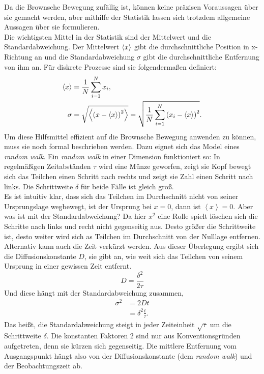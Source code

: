 Da die Brownsche Bewegung zufällig ist, können keine präzisen Voraussagen über sie gemacht werden, aber mithilfe der Statistik lassen sich trotzdem allgemeine Aussagen über sie formulieren.\\
Die wichtigsten Mittel in der Statistik sind der Mittelwert und die Standardabweichung. Der Mittelwert $\left< x \right>$ gibt die durchschnittliche Position in x-Richtung an und die Standardabweichung $\sigma$ gibt die durchschnittliche Entfernung von ihm an. Für diskrete Prozesse sind sie folgendermaßen definiert:
\begin{align}
  \left< x \right> & = \frac{1}{N} \sum_{i=1}^{N} x_i, \\
  \sigma & = \sqrt{\left<  {\left( x - \left< x \right> \right)}^2  \right>} = \sqrt{\frac{1}{N} \sum_{i=1}^{N} {\left( x_i - \left< x \right> \right)}^2}.
\end{align}
Um diese Hilfsmittel effizient auf die Brownsche Bewegung anwenden zu können, muss sie noch formal beschrieben werden. Dazu eignet sich das Model eines \emph{random walk}. Ein \emph{random walk} in einer Dimension funktioniert so: In regelmäßigen Zeitabständen $\tau$ wird eine Münze geworfen, zeigt sie Kopf bewegt sich das Teilchen einen Schritt nach rechts und zeigt sie Zahl einen Schritt nach links. Die Schrittweite $\delta$ für beide Fälle ist gleich groß.\\
Es ist intuitiv klar, dass sich das Teilchen im Durchschnitt nicht von seiner Ursprungslage wegbewegt, ist der Ursprung bei $x = 0$, dann ist $\left< x \right> = 0$. Aber was ist mit der Standardabweichung? Da hier $x^2$ eine Rolle spielt löschen sich die Schritte nach links und recht nicht gegenseitig aus.
Desto größer die Schrittweite ist, desto weiter wird sich as Teilchen im Durchschnitt von der Nulllage entfernen. Alternativ kann auch die Zeit verkürzt werden. Aus dieser Überlegung ergibt sich die Diffusionskonstante $D$, sie gibt an, wie weit sich das Teilchen von seinem Ursprung in einer gewissen Zeit entfernt.
\begin{equation}
  D = \frac{\delta^2}{2 \tau}
\end{equation}
Und diese hängt mit der Standardabweichung zusammen,
\begin{align}
  \sigma^2 & = 2Dt \label{eq:diff} \\
   & = \delta^2 \frac{t}{\tau}.
\end{align}
Das heißt, die Standardabweichung steigt in jeder Zeiteinheit $\sqrt{\tau}$ um die Schrittweite $\delta$. Die konstanten Faktoren 2 sind nur aus Konventionsgründen aufgetreten, denn sie kürzen sich gegenseitig. Die mittlere Entfernung vom Ausgangspunkt hängt also von der Diffusionskonstante (dem \emph{random walk}) und der Beobachtungszeit ab.\\


